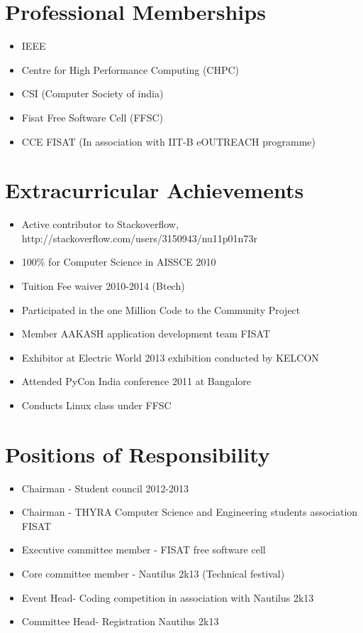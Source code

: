 \documentclass[a4paper]{article}
\begin{document}
\section{Professional Memberships}
\begin{itemize}
\item IEEE
\item Centre for High Performance Computing (CHPC)
\item CSI (Computer Society of india)
\item Fisat Free Software Cell (FFSC)
\item CCE FISAT (In association with IIT-B eOUTREACH programme)

\end{itemize}

\section{Extracurricular Achievements}
\begin{itemize}
\item Active contributor to Stackoverflow, http://stackoverflow.com/users/3150943/nu11p01n73r
\item 100\% for Computer Science in AISSCE 2010
\item Tuition Fee waiver 2010-2014 (Btech)
\item Participated in the one Million Code to the Community Project
\item Member AAKASH application development team FISAT
\item Exhibitor at Electric World 2013 exhibition conducted by KELCON
\item Attended PyCon India conference 2011 at Bangalore
\item Conducts Linux class under FFSC
\end{itemize}

\section{Positions of Responsibility}
\begin{itemize}
\item Chairman - Student council 2012-2013
\item Chairman - THYRA Computer Science and Engineering students association FISAT
\item Executive committee member - FISAT free software cell
\item Core committee member - Nautilus 2k13 (Technical festival)
\item Event Head- Coding competition in association with Nautilus 2k13
\item Committee Head- Registration Nautilus 2k13
\end{itemize}
\end{document}
